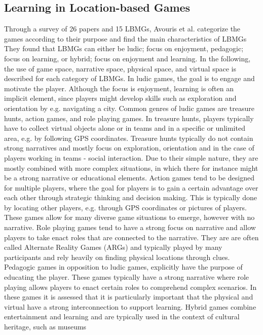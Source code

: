 \subsection{Learning in Location-based Games}
Through a survey of 26 papers and 15 LBMGs, Avouris et
al. categorize the games according to their purpose and find
the main characteristics of LBMGs
They found that LBMGs can either be ludic; focus
on enjoyment, pedagogic; focus on learning, or hybrid;
focus on enjoyment and learning. In the following, the use of
game space, narrative space, physical space, and virtual space
is described for each category of LBMGs.
In ludic games, the goal is to engage and motivate the player.
Although the focus is enjoyment, learning is often an implicit
element, since players might develop skills such as exploration
and orientation by e.g. navigating a city. Common
genres of ludic games are treasure hunts, action games, and
role playing games.
In treasure hunts, players typically have to collect virtual objects
alone or in teams and in a specific or unlimited area, e.g.
by following GPS coordinates. Treasure hunts typically do
not contain strong narratives and mostly focus on exploration,
orientation and in the case of players working in teams - social
interaction. Due to their simple nature, they are mostly
combined with more complex situations, in which there for
instance might be a strong narrative or educational elements.
Action games tend to be designed for multiple players, where
the goal for players is to gain a certain advantage over each
other through strategic thinking and decision making. This
is typically done by locating other players, e.g. through GPS
coordinates or pictures of players. These games allow for
many diverse game situations to emerge, however with no
narrative.
Role playing games tend to have a strong focus on narrative
and allow players to take enact roles that are connected to the
narrative. They are are often called Alternate Reality Games
(ARGs) and typically played by many participants and rely
heavily on finding physical locations through clues.
Pedagogic games in opposition to ludic games, explicitly
have the purpose of educating the player. These games typically
have a strong narrative where role playing allows players
to enact certain roles to comprehend complex scenarios.
In these games it is assessed that it is particularly important
that the physical and virtual have a strong interconnection to
support learning.
Hybrid games combine entertainment and learning and are
typically used in the context of cultural heritage, such as museums
